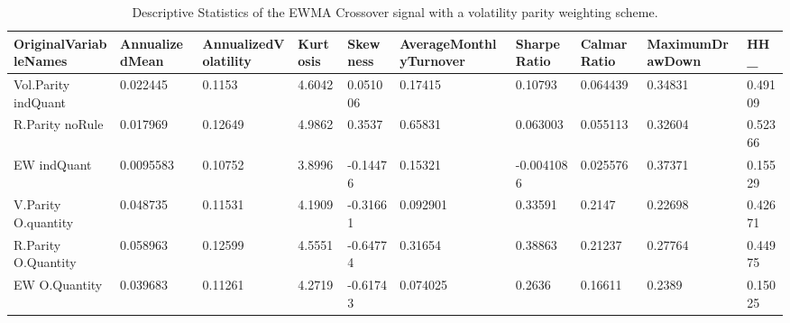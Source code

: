 \begin{table}[H]
\centering
\begin{tabular}{llllllllll}
OriginalVariableNames & AnnualizedMean & AnnualizedVolatility & Kurtosis & Skewness & AverageMonthlyTurnover & SharpeRatio & CalmarRatio & MaximumDrawDown & HH_ \\ 
\hline 
Vol.Parity indQuant & 0.022445 & 0.1153 & 4.6042 & 0.051006 & 0.17415 & 0.10793 & 0.064439 & 0.34831 & 0.49109 \\ 
R.Parity noRule & 0.017969 & 0.12649 & 4.9862 & 0.3537 & 0.65831 & 0.063003 & 0.055113 & 0.32604 & 0.52366 \\ 
EW indQuant & 0.0095583 & 0.10752 & 3.8996 & -0.14476 & 0.15321 & -0.0041086 & 0.025576 & 0.37371 & 0.15529 \\ 
V.Parity O.quantity & 0.048735 & 0.11531 & 4.1909 & -0.31661 & 0.092901 & 0.33591 & 0.2147 & 0.22698 & 0.42671 \\ 
R.Parity O.Quantity & 0.058963 & 0.12599 & 4.5551 & -0.64774 & 0.31654 & 0.38863 & 0.21237 & 0.27764 & 0.44975 \\ 
EW O.Quantity & 0.039683 & 0.11261 & 4.2719 & -0.61743 & 0.074025 & 0.2636 & 0.16611 & 0.2389 & 0.15025 \\ 
\hline
\end{tabular}
\caption{Descriptive Statistics of the EWMA Crossover signal with a volatility parity weighting scheme.}
\label{MBBS_stats}
\end{table}